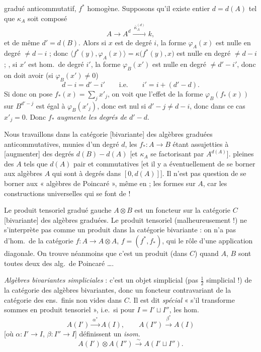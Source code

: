 \documentclass[11pt,a4paper]{article}
\begin{document}
gradué anticommutatif, $f^{*}$ homogène. Supposons qu'il existe
 entier $d = d(A)$ tel que $\kappa_{A}$ soit composé
\[ A \to A^{d} \xrightarrow{\ \bar{\kappa}_{A}^{(d)}\ } k , \]
et de même $d' = d(B)$. Alors si $x$ est de degré $i$, la forme
$\varphi_{A}(x)$ est nulle en degré $\neq d - i$ ; donc
$\langle f^{*}(y), \varphi_{A}(x) \rangle = \kappa\bigl(f^{*}(y), x\bigr)$ est
nulle \struck{\ill{}} en degré $\neq d - i$ ; , si $x'$ \struck{\ill{}} est hom.\ de degré $i'$, la forme
$\varphi_{B}(x')$ est nulle en degré $\neq d' - i'$, donc on doit avoir (si
$\varphi_{B}(x') \neq 0$)
\[ d - i = d' - i' \qquad \text{i.e.} \qquad i' = i + (d' - d) . \]
Si donc on pose $f_{*}(x) = \sum_{j} x'_{j}$, on voit que l'effet de la forme
$\varphi_{B}(f_{*}(x))$ sur $B^{d'-j}$ est égal à $\varphi_{B}(x'_{j})$, donc est
nul si  $d' - j \neq d - i$, donc dans ce cas $x'_{j} = 0$. Donc
$f_{*}$ \emph{augmente les degrés de $d' - d$}.

Nous travaillons dans la catégorie [bivariante] des algèbres graduées
anticommutatives, munies d'un degré $d$, les $f_{*} : A \to B$ étant
assujetties à [augmenter] des degrés $d(B) - d(A)$ [et $\kappa_{A}$ se
factorisant par $A^{d(A)}$].  pleines des $A$
tels que $d(A)$ pair et commutatives [et il y a \ill{} éventuellement de se
borner aux algèbres $A$ qui sont à degrés \struck{\ill{}} dans $[0, d(A)]$]. Il
n'est pas question de se borner aux « algèbres de Poincaré », même en
 ; \ill{} les formes sur $A$, car les
constructions universelles qui se font \ill{} de \ill{} \ill{}
 !



Le produit tensoriel gradué gauche $A \otimes B$ est un foncteur sur la
catégorie $C$ [bivariante] des algèbres graduées. Le produit tensoriel
(malheureusement !) ne s'interprète pas comme un produit dans la catégorie
bivariante : on n'a pas \ill{} d'hom.\ de la catégorie
$f : A \to A \otimes A$, $f = (f^{*}, f_{*})$, qui  le rôle
d'une application diagonale. On trouve néanmoins que c'est un produit (dans
$C$) quand $A$, $B$ sont toutes deux des alg.\ de Poincaré ….

\emph{Algèbres bivariantes simpliciales} : c'est un objet simplicial (pas
$\frac{1}{2}$ simplicial !) de la catégorie des algèbres bivariantes, donc un
foncteur contravariant de la catégorie des ens.\ finis non vides dans $C$. Il
est dit \emph{spécial} « s'il transforme sommes en produit tensoriel », i.e.\
si pour $I = I' \sqcup I''$, les hom.
\[ A(I') \xrightarrow{\ \alpha^{*}\ } A(I), \qquad A(I'') \xrightarrow{\ \beta^{*}\ } A(I) \]
[où $\alpha : I' \to I$, $\beta : I'' \to I$] définissent un
\emph{isom.}
\[ A(I') \otimes A(I'') \xrightarrow{\ \sim\ } A(I' \sqcup I'') . \]
\end{document}

